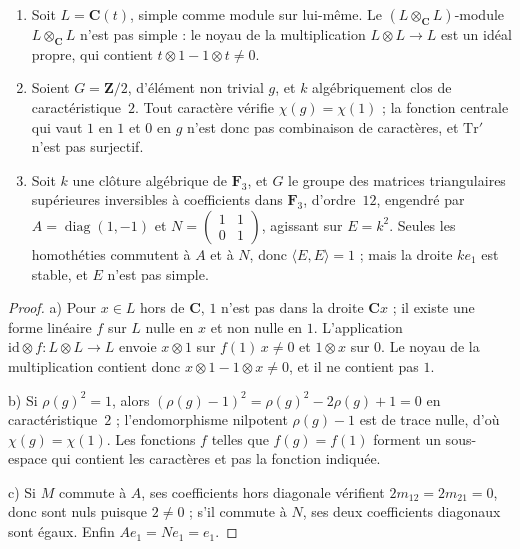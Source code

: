\begin{encadre}
\begin{contrexemple}
\mbox{}\begin{enumerate}
\item[a)] Soit $L = \mathbf C(t)$, simple comme module sur lui-même. Le $(L \otimes_{\mathbf C} L)$-module $L \otimes_{\mathbf C} L$ n'est pas simple : le noyau de la multiplication $L \otimes L \to L$ est un idéal propre, qui contient $t \otimes 1 - 1 \otimes t \neq 0$.
\item[b)] Soient $G = \mathbf Z/2$, d'élément non trivial $g$, et $k$ algébriquement clos de caractéristique~$2$. Tout caractère vérifie $\chi(g) = \chi(1)$ ; la fonction centrale qui vaut $1$ en $1$ et $0$ en $g$ n'est donc pas combinaison de caractères, et $\mathrm{Tr}'$ n'est pas surjectif.
\item[c)] Soit $k$ une clôture algébrique de $\mathbf F_3$, et $G$ le groupe des matrices triangulaires supérieures inversibles à coefficients dans $\mathbf F_3$, d'ordre~$12$, engendré par $A = \operatorname{diag}(1, -1)$ et $N = \left(\begin{smallmatrix} 1 & 1 \\ 0 & 1 \end{smallmatrix}\right)$, agissant sur $E = k^2$. Seules les homothéties commutent à $A$ et à $N$, donc $\langle E, E\rangle = 1$ ; mais la droite $k e_1$ est stable, et $E$ n'est pas simple.
\end{enumerate}
\end{contrexemple}
\end{encadre}

\begin{proof}
a) Pour $x \in L$ hors de $\mathbf C$, $1$ n'est pas dans la droite $\mathbf C x$ ; il existe une forme linéaire $f$ sur $L$ nulle en $x$ et non nulle en $1$. L'application $\mathrm{id} \otimes f : L \otimes L \to L$ envoie $x \otimes 1$ sur $f(1)\,x \neq 0$ et $1 \otimes x$ sur $0$. Le noyau de la multiplication contient donc $x \otimes 1 - 1 \otimes x \neq 0$, et il ne contient pas $1$.

b) Si $\rho(g)^2 = 1$, alors $(\rho(g) - 1)^2 = \rho(g)^2 - 2\rho(g) + 1 = 0$ en caractéristique~$2$ ; l'endomorphisme nilpotent $\rho(g) - 1$ est de trace nulle, d'où $\chi(g) = \chi(1)$. Les fonctions $f$ telles que $f(g) = f(1)$ forment un sous-espace qui contient les caractères et pas la fonction indiquée.

c) Si $M$ commute à $A$, ses coefficients hors diagonale vérifient $2m_{12} = 2m_{21} = 0$, donc sont nuls puisque $2 \neq 0$ ; s'il commute à $N$, ses deux coefficients diagonaux sont égaux. Enfin $A e_1 = N e_1 = e_1$.
\end{proof}


